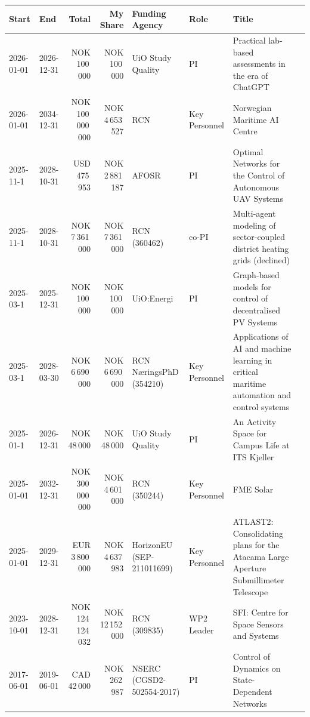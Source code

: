 \begin{longtable}{llr rllp{8cm}l}
\textbf{Start} & \textbf{End} & \textbf{Total} & \textbf{My Share} & \textbf{Funding Agency} & \textbf{Role} & \textbf{Title} \\
\hline
2026-01-01 & 2026-12-31 & NOK 100\,000 & NOK 100\,000 & UiO Study Quality & PI & Practical lab-based assessments in the era of ChatGPT \\
2026-01-01 & 2034-12-31 & NOK 100\,000\,000 & NOK 4\,653\,527 & RCN & Key Personnel & Norwegian Maritime AI Centre \\
2025-11-1 & 2028-10-31 & USD 475\,953 & NOK 2\,881\,187 & AFOSR & PI & Optimal Networks for the Control of Autonomous UAV Systems \\
2025-11-1 & 2028-10-31 & NOK 7\,361\,000 & NOK 7\,361\,000 & RCN (360462) & co-PI & Multi-agent modeling of sector-coupled district heating grids (declined) \\
2025-03-1 & 2025-12-31 & NOK 100\,000 & NOK 100\,000 & UiO:Energi & PI & Graph-based models for control of decentralised PV Systems \\
2025-03-1 & 2028-03-30 & NOK 6\,690\,000 & NOK 6\,690\,000 & RCN N\ae ringsPhD (354210) & Key Personnel & Applications of AI and machine learning in critical maritime automation and control systems \\
2025-01-1 & 2026-12-31 & NOK 48\,000 & NOK 48\,000 & UiO Study Quality & PI & An Activity Space for Campus Life at ITS Kjeller \\
2025-01-01 & 2032-12-31 & NOK 300\,000\,000 & NOK 4\,601\,000 & RCN (350244) & Key Personnel & FME Solar \\
2025-01-01 & 2029-12-31 & EUR 3\,800\,000 & NOK 4\,637\,983 & HorizonEU (SEP-211011699) & Key Personnel & ATLAST2: Consolidating plans for the Atacama Large Aperture Submillimeter Telescope \\
2023-10-01 & 2028-12-31 & NOK 124\,124\,032 & NOK 12\,152\,000 &  RCN (309835) &  WP2 Leader & SFI: Centre for Space Sensors and Systems \\
2017-06-01 & 2019-06-01 & CAD 42\,000 & NOK 262\,987 &  NSERC (CGSD2-502554-2017) &  PI & Control of Dynamics on State-Dependent Networks \\
\end{longtable}
